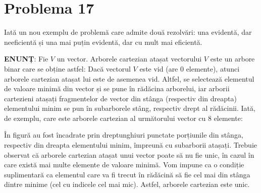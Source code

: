 \section{Problema 17}

Iată un nou exemplu de problemă care admite două rezolvări: una evidentă, dar
neeficientă și una mai puțin evidentă, dar cu mult mai eficientă.

{\bf ENUNȚ}: Fie $V$ un vector. Arborele cartezian atașat vectorului $V$ este
un arbore binar care se obține astfel: Dacă vectorul $V$ este vid (are 0
elemente), atunci arborele cartezian atașat lui este de asemenea vid. Altfel,
se selectează elementul de valoare minimă din vector și se pune în rădăcina
arborelui, iar arborii cartezieni atașați fragmentelor de vector din stânga
(respectiv din dreapta) elementului minim se pun în subarborele stâng,
respectiv drept al rădăcinii. Iată, de exemplu, care este arborele cartezian
al următorului vector cu 8 elemente:

\newcommand\cartesianStack[3] {
  \matrix[mat] (m) at (0,2) {
    #1 \& #2 \& #3 \& \ \\
  };

  \node at ([xshift=-1em]m.west) {$S$};
}


În figură au fost încadrate prin dreptunghiuri punctate porțiunile din stânga,
respectiv din dreapta elementului minim, împreună cu subarborii
atașați. Trebuie observat că arborele cartezian atașat unui vector poate să nu
fie unic, în cazul în care există mai multe elemente de valoare minimă. Vom
impune ca o condiție suplimentară ca elementul care va fi trecut în rădăcină
să fie cel mai din stânga dintre minime (cel cu indicele cel mai mic). Astfel,
arborele cartezian este unic.

